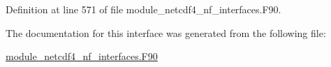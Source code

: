 Definition at line 571 of file module\+\_\+netcdf4\+\_\+nf\+\_\+interfaces.\+F90.



The documentation for this interface was generated from the following file\+:\begin{DoxyCompactItemize}
\item 
\hyperlink{module__netcdf4__nf__interfaces_8F90}{module\+\_\+netcdf4\+\_\+nf\+\_\+interfaces.\+F90}\end{DoxyCompactItemize}
